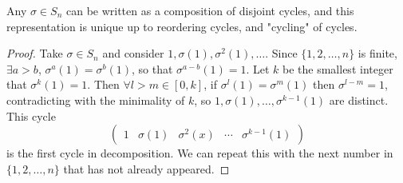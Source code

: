 \documentclass[a4paper]{article}
\begin{document}
    \begin{theorem}\label{thm:disjoint cycle decomp}
        Any $ \sigma\in S_n $ can be written as a composition of disjoint cycles, and this representation is unique up to reordering cycles, and "cycling" of cycles.
    \end{theorem}
    \begin{proof}
        Take $ \sigma\in S_n $ and consider $ 1,\sigma(1),\sigma^2(1),\dots $. Since $ \{1,2,\dots,n\} $ is finite, $ \exists a>b $, $ \sigma^a(1)=\sigma^b(1) $, so that $ \sigma^{a-b}(1)=1 $. Let $k$ be the smallest integer that $ \sigma^{k}(1)=1 $. Then $ \forall l>m\in [0,k] $, if $ \sigma^{l}(1)=\sigma^{m}(1) $ then $ \sigma^{l-m}=1 $, contradicting with the minimality of $k$, so $ 1,\sigma(1),\dots,\sigma^{k-1}(1) $ are distinct. This cycle 
        \[
            \begin{pmatrix}
                1&\sigma(1)&\sigma^2(x)&\cdots&\sigma^{k-1}(1)
            \end{pmatrix}
        \]
        is the first cycle in decomposition. We can repeat this with the next number in $\{1,2,\dots,n\}$ that has not already appeared.


\end{proof}
\end{document}
